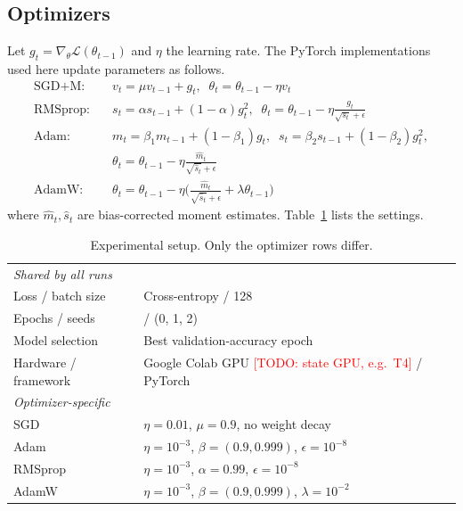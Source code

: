 \documentclass[conference]{IEEEtran}
\newcommand{\todo}[1]{\textcolor{red}{[TODO: #1]}}   %
\begin{document}
\subsection{Optimizers}
Let $g_t=\nabla_\theta\mathcal{L}(\theta_{t-1})$ and $\eta$ the learning rate. The PyTorch implementations used here update parameters as follows.
\begin{align}
\text{SGD+M:}\quad & v_t=\mu v_{t-1}+g_t,\;\; \theta_t=\theta_{t-1}-\eta v_t\\
\text{RMSprop:}\quad & s_t=\alpha s_{t-1}+(1-\alpha)g_t^2,\;\; \theta_t=\theta_{t-1}-\eta\frac{g_t}{\sqrt{s_t}+\epsilon}\\
\text{Adam:}\quad & m_t=\beta_1 m_{t-1}+(1-\beta_1)g_t,\;\; s_t=\beta_2 s_{t-1}+(1-\beta_2)g_t^2,\nonumber\\
& \theta_t=\theta_{t-1}-\eta\frac{\hat m_t}{\sqrt{\hat s_t}+\epsilon}\\
\text{AdamW:}\quad & \theta_t=\theta_{t-1}-\eta\Big(\frac{\hat m_t}{\sqrt{\hat s_t}+\epsilon}+\lambda\theta_{t-1}\Big)
\end{align}
where $\hat m_t,\hat s_t$ are bias-corrected moment estimates. Table~\ref{tab:setup} lists the settings.

\begin{table}[t]
\caption{Experimental setup. Only the optimizer rows differ.}
\label{tab:setup}
\centering\small
\begin{tabular}{ll}
\toprule
\multicolumn{2}{l}{\textit{Shared by all runs}}\\
Loss / batch size & Cross-entropy / 128\\
Epochs / seeds & \nEpochs{} / \nSeeds{} (0, 1, 2)\\
Model selection & Best validation-accuracy epoch\\
Hardware / framework & Google Colab GPU \todo{state GPU, e.g.\ T4} / PyTorch\\
\midrule
\multicolumn{2}{l}{\textit{Optimizer-specific}}\\
SGD & $\eta=0.01$, $\mu=0.9$, no weight decay\\
Adam & $\eta=10^{-3}$, $\beta=(0.9,0.999)$, $\epsilon=10^{-8}$\\
RMSprop & $\eta=10^{-3}$, $\alpha=0.99$, $\epsilon=10^{-8}$\\
AdamW & $\eta=10^{-3}$, $\beta=(0.9,0.999)$, $\lambda=10^{-2}$\\
\bottomrule
\end{tabular}
\end{table}
\end{document}

